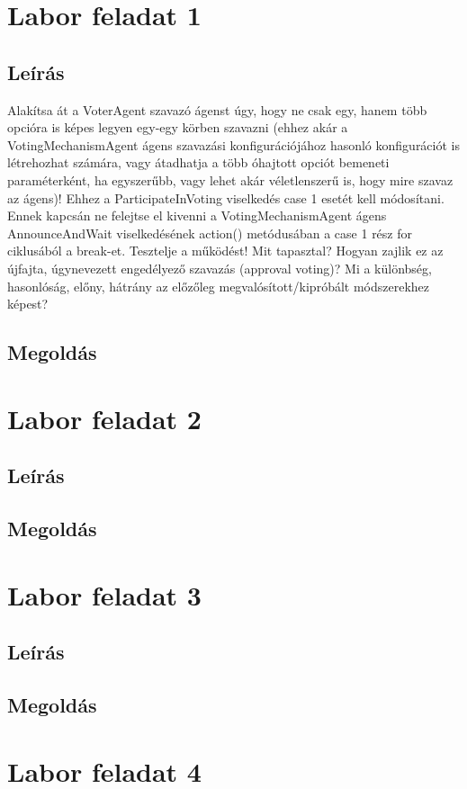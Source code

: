 \section{Labor feladat 1}
\subsection{Leírás}
Alakítsa át a VoterAgent szavazó ágenst úgy, hogy ne csak egy, hanem több opcióra is
képes legyen egy-egy körben szavazni (ehhez akár a VotingMechanismAgent ágens
szavazási konfigurációjához hasonló konfigurációt is létrehozhat számára, vagy átadhatja a
több óhajtott opciót bemeneti paraméterként, ha egyszerűbb, vagy lehet akár véletlenszerű is,
hogy mire szavaz az ágens)! Ehhez a ParticipateInVoting viselkedés case 1 esetét
kell módosítani. Ennek kapcsán ne felejtse el kivenni a VotingMechanismAgent ágens
AnnounceAndWait viselkedésének action() metódusában a case 1 rész for
ciklusából a break-et. Tesztelje a működést! Mit tapasztal? Hogyan zajlik ez az újfajta,
úgynevezett engedélyező szavazás (approval voting)? Mi a különbség, hasonlóság, előny,
hátrány az előzőleg megvalósított/kipróbált módszerekhez képest?
\subsection{Megoldás}

\section{Labor feladat 2}
\subsection{Leírás}
\subsection{Megoldás}

\section{Labor feladat 3}
\subsection{Leírás}
\subsection{Megoldás}

\section{Labor feladat 4}
